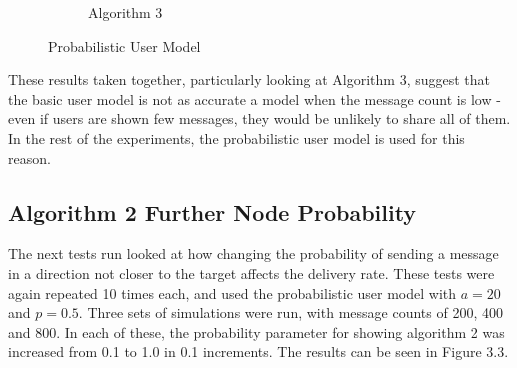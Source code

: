 \documentclass[bsc,frontabs,twoside,singlespacing,parskip,deptreport]{infthesis}     %
\begin{document}
\begin{figure}
\begin{subfigure}[b]{0.3\textwidth}
        \caption{Algorithm 3}
        \label{fig:results/Prob50Share_OnlyBest}
    \end{subfigure}
  	\vspace{-5pt}
    \caption{Probabilistic User Model}\label{fig:Prob50UserModel}
  	\vspace{-25pt}
\end{figure}

These results taken together, particularly looking at Algorithm 3, suggest that the basic user model is not as accurate a model when the message count is low - even if users are shown few messages, they would be unlikely to share all of them. In the rest of the experiments, the probabilistic user model is used for this reason.

\subsection{Algorithm 2 Further Node Probability}
The next tests run looked at how changing the probability of sending a message in a direction not closer to the target affects the delivery rate. These tests were again repeated 10 times each, and used the probabilistic user model with $a = 20$ and $p = 0.5$. Three sets of simulations were run, with message counts of 200, 400 and 800. In each of these, the probability parameter for showing algorithm 2 was increased from 0.1 to 1.0 in 0.1 increments. The results can be seen in Figure 3.3.
\end{document}
